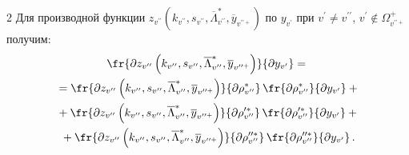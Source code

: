 \begin{multicols}{2}
\noindent
Для производной функции $z_{ v^{\prime\prime}} \left(k_{ v^{\prime\prime}}, 
s_{ v^{\prime\prime}}, \overline{\Lambda}^*_{ v^{\prime\prime}}, 
\overline{y}_{ v^{\prime\prime +}}\right)$ по $y_{v^\prime}$ при $v^\prime\not= 
v^{\prime\prime}$, $v^\prime\not\in \Omega^+_{v^{\prime\prime +}}$ получим:
   \begin{multline}
      \fr{\partial z_{ v^{\prime\prime}}\left(k_{ v^{\prime\prime}}, s_{ 
v^{\prime\prime}}, \overline{\Lambda}^*_{ v^{\prime\prime}}, \overline{y}_{ 
v^{\prime\prime +}}\right)}{\partial y_{v^\prime}}={}\\
{}=
   \fr{\partial z_{ v^{\prime\prime}}\left(k_{ v^{\prime\prime}}, s_{ 
v^{\prime\prime}}, \overline{\Lambda}^*_{ v^{\prime\prime}}, \overline{y}_{ 
v^{\prime\prime +}}\right)}{\partial \rho^*_{ v^{\prime\prime}}}\,\fr{\partial \rho^*_{ 
v^{\prime\prime}}}{\partial y_{v^\prime}}+{}\\
{}+
   \fr{\partial z_{ v^{\prime\prime}}\left(k_{ v^{\prime\prime}},s_{ 
v^{\prime\prime}}, \overline{\Lambda}^*_{ v^{\prime\prime}},
\overline{y}_{v^{\prime\prime +}}\right)}{\partial \rho^{\prime *}_{ v^{\prime\prime}}}\,
   \fr{\partial \rho_{ v^{\prime\prime}}^{\prime *}}{\partial 
y_{v^\prime}}+{}\\
   {}+ \fr{\partial z_{ v^{\prime\prime}}\left(k_{ v^{\prime\prime}}, s_{ 
v^{\prime\prime}}, \overline{\Lambda}^*_{ v^{\prime\prime}}, 
\overline{y}_{v^{\prime\prime +}}\right)}{\partial \rho_{ v^{\prime\prime}}^{\prime\prime *}}\,
\fr{\partial \rho_{v^{\prime\prime}}^{\prime\prime *}}{\partial y_{v^\prime}}\,.
   \label{e11aga}
   \end{multline}
     

\end{multicols}
